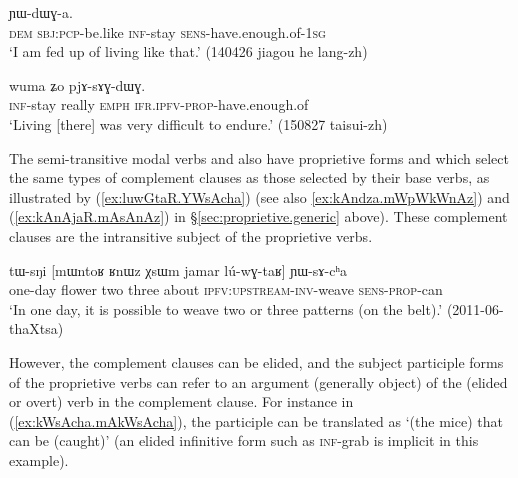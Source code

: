 \begin{exe}
\ex \label{ex:kArAZi.YWdWGa}
 ɲɯ-dɯɣ-a. \\
\textsc{dem} \textsc{sbj}:\textsc{pcp}-be.like \textsc{inf}-stay \textsc{sens}-have.enough.of-\textsc{1sg} \\
\glt `I am fed up of living like that.' (140426 jiagou he lang-zh) 
\end{exe}

\begin{exe}
\ex \label{ex:kArAZi.pjAsAGdWG}
\gll [kɤ-rɤʑi] wuma ʑo pjɤ-sɤɣ-dɯɣ. \\
\textsc{inf}-stay really \textsc{emph} \textsc{ifr}.\textsc{ipfv}-\textsc{prop}-have.enough.of \\
\glt `Living [there] was very difficult to endure.' (150827 taisui-zh) 
\end{exe}

The semi-transitive modal verbs  and  also have proprietive forms      and  which select  the same types of complement clauses as those selected by their base verbs, as illustrated by (\ref{ex:luwGtaR.YWsAcha}) (see also \ref{ex:kAndza.mWpWkWnAz}) and (\ref{ex:kAnAjaR.mAsAnAz}) in §\ref{sec:proprietive.generic} above). These complement clauses are the intransitive subject of the proprietive verbs.
  
\begin{exe}
\ex \label{ex:luwGtaR.YWsAcha}
\gll  tɯ-sŋi [mɯntoʁ ʁnɯz χsɯm jamar lú-wɣ-taʁ] ɲɯ-sɤ-cʰa \\
one-day flower two three about \textsc{ipfv}:\textsc{upstream}-\textsc{inv}-weave  \textsc{sens}-\textsc{prop}-can \\
\glt `In one day, it is possible to weave two or three patterns (on the belt).' (2011-06-thaXtsa)
\end{exe}

However, the complement clauses can be elided, and the subject participle forms of the proprietive verbs can refer to an argument (generally object) of the  (elided or overt) verb in the complement clause. For instance in (\ref{ex:kWsAcha.mAkWsAcha}), the participle  can be translated as `(the mice) that can be (caught)' (an elided infinitive form such as  \textsc{inf}-grab is implicit in this example).

